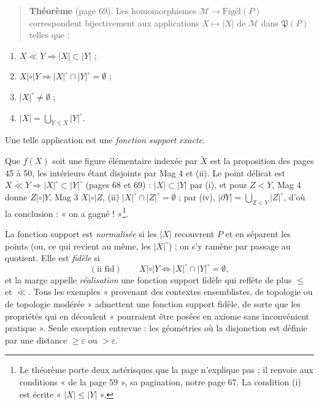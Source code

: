 \documentclass[11pt,a4paper]{article}
\begin{document}
\begin{quote}
\textbf{Théorème} (page 69). Les homomorphismes $\mathcal{M} \to
\mathrm{Figél}(P)$ correspondent bijectivement aux applications $X \mapsto |X|$
de $\mathcal{M}$ dans $\mathfrak{P}(P)$ telles que :
\end{quote}
\begin{enumerate}
\item[(i)] $X \ll Y \Rightarrow |X| \subset |Y|$ ;
\item[(ii)] $X \mathrel{|\circ|} Y \Rightarrow |X|^{\circ} \cap |Y|^{\circ} =
\emptyset$ ;
\item[(iii)] $|X|^{\circ} \neq \emptyset$ ;
\item[(iv)] $|X| = \bigcup_{Y \leq X} |Y|^{\circ}$.
\end{enumerate}
Une telle application est une \emph{fonction support exacte}.


Que $f(X)$ soit une figure élémentaire indexée par $\widetilde{X}$ est la
proposition des pages 45 à 50, les intérieurs étant disjoints par Mag 4 et (ii).
Le point délicat est $X \mathrel{\mathring{\ll}} Y \Rightarrow |X|^{\circ}
\subset |Y|^{\circ}$ (pages 68 et 69) : $|X| \subset |Y|$ par (i), et pour $Z <
Y$, Mag 4 donne $Z \mathrel{|\circ|} Y$, Mag 3 $X \mathrel{|\circ|} Z$, (ii)
$|X|^{\circ} \cap |Z|^{\circ} = \emptyset$ ; par (iv), $|\partial Y| =
\bigcup_{Z < Y} |Z|^{\circ}$, d'où la conclusion : « on a gagné ! »\footnote{Le
théorème porte deux astérisques que la page n'explique pas ; il renvoie aux
conditions « de la page 59 », sa pagination, notre page 67. La condition (i)
est écrite « $|X| \leq |Y|$ ».}.

La fonction support est \emph{normalisée} si les $|X|$ recouvrent $P$ et en
séparent les points (ou, ce qui revient au même, les $|X|^{\circ}$) ; on s'y
ramène par passage au quotient. Elle est \emph{fidèle} si
\[
(\text{ii fid}) \qquad X \mathrel{|\circ|} Y \iff |X|^{\circ} \cap |Y|^{\circ}
= \emptyset ,
\]
et la marge appelle \emph{réalisation} une fonction support fidèle qui reflète
de plus $\leq$ et $\mathring{\ll}$. Tous les exemples « provenant des contextes
ensemblistes, de topologie ou de topologie modérée » admettent une fonction
support fidèle, de sorte que les propriétés qui en découlent « pourraient être
posées en axiome sans inconvénient pratique ». Seule exception entrevue : les
géométries où la disjonction est définie par une distance $\geq \varepsilon$ ou
$> \varepsilon$.
\end{document}
